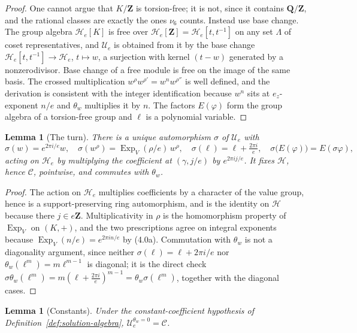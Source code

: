 \documentclass[11pt]{article}
\newtheorem{lemma}[theorem]{Lemma}
\theoremstyle{definition}
\theoremstyle{remark}
\newcommand{\Q}{\mathbf Q}
\newcommand{\Z}{\mathbf Z}
\begin{document}
\begin{proof}
One cannot argue that $K/\Z$ is torsion-free; it is not, since it contains
$\Q/\Z$, and the rational classes are exactly the ones $\nu_6$ counts. Instead
use base change. The group algebra $\mathcal H_e[K]$ is free over
$\mathcal H_e[\Z]=\mathcal H_e[t,t^{-1}]$ on any set $\Lambda$ of coset
representatives, and $\mathcal U_e$ is obtained from it by the base change
$\mathcal H_e[t,t^{-1}]\to\mathcal H_e$, $t\mapsto w$, a surjection with kernel
$(t-w)$ generated by a nonzerodivisor. Base change of a free module is free on
the image of the same basis. The crossed multiplication $w^\rho
w^{\rho'}=w^nw^{\rho''}$ is well defined, and the derivation is consistent with
the integer identification because $w^n$ sits at $e_z$-exponent $n/e$ and
$\theta_w$ multiplies it by $n$. The factors $E(\varphi)$ form the group algebra
of a torsion-free group and $\ell$ is a polynomial variable.
\end{proof}

\begin{lemma}[The turn]
\label{lem:turn}
There is a unique automorphism $\sigma$ of $\mathcal U_e$ with
\[
  \sigma(w)=e^{2\pi i/e}w,\quad
  \sigma(w^\rho)=\operatorname{Exp}_V(\rho/e)\,w^\rho,\quad
  \sigma(\ell)=\ell+\tfrac{2\pi i}{e},\quad
  \sigma\bigl(E(\varphi)\bigr)=E(\sigma\varphi),
\]
acting on $\mathcal H_e$ by multiplying the coefficient at $(\gamma,j/e)$ by
$e^{2\pi ij/e}$. It fixes $\mathcal H$, hence $\mathcal C$, pointwise, and
commutes with $\theta_w$.
\end{lemma}

\begin{proof}
The action on $\mathcal H_e$ multiplies coefficients by a character of the value
group, hence is a support-preserving ring automorphism, and is the identity on
$\mathcal H$ because there $j\in e\Z$. Multiplicativity in $\rho$ is the
homomorphism property of $\operatorname{Exp}_V$ on $(K,+)$, and the two
prescriptions agree on integral exponents because
$\operatorname{Exp}_V(n/e)=e^{2\pi in/e}$ by (4.0a). Commutation with
$\theta_w$ is not a diagonality argument, since neither
$\sigma(\ell)=\ell+2\pi i/e$ nor $\theta_w(\ell^m)=m\ell^{m-1}$ is diagonal; it
is the direct check
$\sigma\theta_w(\ell^m)=m(\ell+\tfrac{2\pi i}e)^{m-1}=\theta_w\sigma(\ell^m)$,
together with the diagonal cases.
\end{proof}

\begin{lemma}[Constants]
\label{lem:constants}
Under the constant-coefficient hypothesis of
Definition~\ref{def:solution-algebra}, $\mathcal U_e^{\theta_w=0}=\mathcal C$.
\end{lemma}
\end{document}
